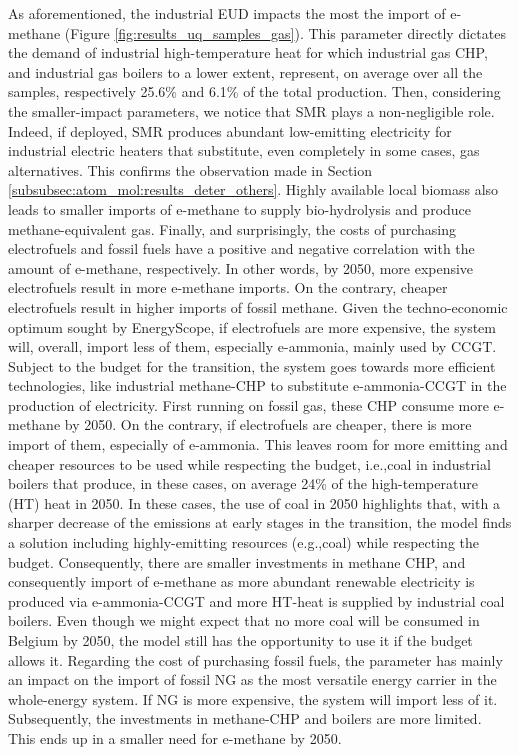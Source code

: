 \documentclass[11pt,twoside,a4paper,english]{article}
\def\eg{e.g.,}
\def\ie{i.e.,}
\begin{document}
\newpage
As aforementioned, the industrial \gls{EUD} impacts the most the import of e-methane (Figure \ref{fig:results_uq_samples_gas}). This parameter directly dictates the demand of industrial high-temperature heat for which industrial gas \gls{CHP}, and industrial gas boilers to a lower extent, represent, on average over all the samples, respectively 25.6\% and 6.1\% of the total production. Then, considering the smaller-impact parameters, we notice that \gls{SMR} plays a non-negligible role. Indeed, if deployed, \gls{SMR} produces abundant low-emitting electricity for industrial electric heaters that substitute, even completely in some cases, gas alternatives. This confirms the observation made in Section \ref{subsubsec:atom_mol:results_deter_others}. Highly available local biomass also leads to smaller imports of e-methane to supply bio-hydrolysis and produce methane-equivalent gas. Finally, and surprisingly, the costs of purchasing electrofuels and fossil fuels have a positive and negative correlation with the amount of e-methane, respectively. In other words, by 2050, more expensive electrofuels result in more e-methane imports. On the contrary, cheaper electrofuels result in higher imports of fossil methane. Given the techno-economic optimum sought by EnergyScope, if electrofuels are more expensive, the system will, overall, import less of them, especially e-ammonia, mainly used by \gls{CCGT}. Subject to the  budget for the transition, the system goes towards more efficient technologies, like industrial methane-\gls{CHP} to substitute e-ammonia-\gls{CCGT} in the production of electricity. First running on fossil gas, these \gls{CHP} consume more e-methane by 2050. On the contrary, if electrofuels are cheaper, there is more import of them, especially of e-ammonia. This leaves room for more emitting and cheaper resources to be used while respecting the  budget, \ie coal in industrial boilers that produce, in these cases, on average 24\% of the high-temperature (HT) heat in 2050. In these cases, the use of coal in 2050 highlights that, with a sharper decrease of the emissions at early stages in the transition, the model finds a solution including highly-emitting resources (\eg coal) while respecting the  budget. Consequently, there are smaller investments in methane \gls{CHP}, and consequently import of e-methane as more abundant renewable electricity is produced via e-ammonia-\gls{CCGT} and more HT-heat is supplied by industrial coal boilers. Even though we might expect that no more coal will be consumed in Belgium by 2050, the model still has the opportunity to use it if the  budget allows it. Regarding the cost of purchasing fossil fuels, the parameter has mainly an impact on the import of fossil \gls{NG} as the most versatile energy carrier in the whole-energy system. If \gls{NG} is more expensive, the system will import less of it. Subsequently, the investments in methane-\gls{CHP} and boilers are more limited. This ends up in a smaller need for e-methane by 2050.
\end{document}
